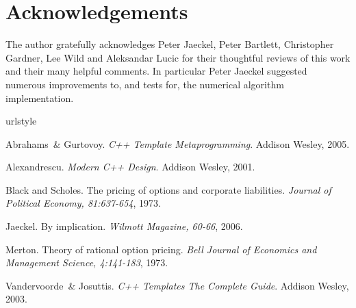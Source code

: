 \documentclass[a4paper,twoside,twocolumn]{article}
\begin{document}
\section{Acknowledgements}
The author gratefully acknowledges Peter Jaeckel, Peter Bartlett,
Christopher Gardner, Lee Wild and Aleksandar Lucic for their
thoughtful reviews of this work and their many helpful comments. In
particular Peter Jaeckel suggested numerous improvements to, and tests
for, the numerical algorithm implementation.



\begin{thebibliography}{6}
\providecommand{\natexlab}[1]{#1}
\providecommand{\url}[1]{\texttt{#1}}
\expandafter\ifx\csname urlstyle\endcsname\relax
  \providecommand{\doi}[1]{doi: #1}\else
  \providecommand{\doi}{doi: \begingroup \urlstyle{rm}\Url}\fi

Abrahams~\& Gurtovoy.
\newblock \emph{C++ Template Metaprogramming}.
\newblock Addison Wesley, 2005.

Alexandrescu.
\newblock \emph{Modern C++ Design}.
\newblock Addison Wesley, 2001.

Black and Scholes.
\newblock The pricing of options and corporate liabilities.
\newblock \emph{Journal of Political Economy, 81:637-654}, 1973.

Jaeckel.
\newblock By implication.
\newblock \emph{Wilmott Magazine, 60-66}, 2006.

Merton.
\newblock Theory of rational option pricing.
\newblock \emph{Bell Journal of Economics and Management Science, 4:141-183},
  1973.

Vandervoorde~\& Josuttis.
\newblock \emph{C++ Templates The Complete Guide}.
\newblock Addison Wesley, 2003.

\end{thebibliography}
\end{document}
